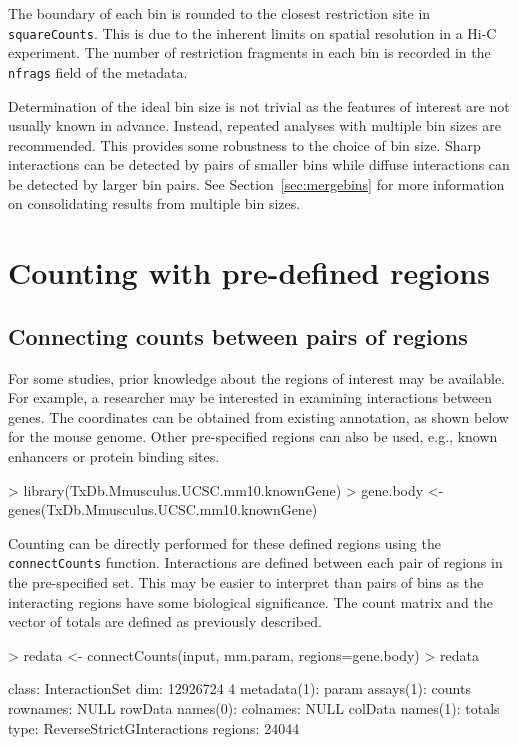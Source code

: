 \documentclass[12pt]{report}
\renewenvironment{Schunk}{\vspace{0pt}}{\vspace{0pt}}
\newcommand{\code}[1]{{\small\texttt{#1}}}
\begin{document}
The boundary of each bin is rounded to the closest restriction site in \code{squareCounts}.
This is due to the inherent limits on spatial resolution in a Hi-C experiment.
The number of restriction fragments in each bin is recorded in the \code{nfrags} field of the metadata.

Determination of the ideal bin size is not trivial as the features of interest are not usually known in advance.
Instead, repeated analyses with multiple bin sizes are recommended.
This provides some robustness to the choice of bin size.
Sharp interactions can be detected by pairs of smaller bins while diffuse interactions can be detected by larger bin pairs.
See Section~\ref{sec:mergebins} for more information on consolidating results from multiple bin sizes.

\section{Counting with pre-defined regions}

\subsection{Connecting counts between pairs of regions}
For some studies, prior knowledge about the regions of interest may be available.
For example, a researcher may be interested in examining interactions between genes.
The coordinates can be obtained from existing annotation, as shown below for the mouse genome.
Other pre-specified regions can also be used, e.g., known enhancers or protein binding sites.

\begin{Schunk}
\begin{Sinput}
> library(TxDb.Mmusculus.UCSC.mm10.knownGene)
> gene.body <- genes(TxDb.Mmusculus.UCSC.mm10.knownGene)
\end{Sinput}
\end{Schunk}


Counting can be directly performed for these defined regions using the \code{connectCounts} function.
Interactions are defined between each pair of regions in the pre-specified set.
This may be easier to interpret than pairs of bins as the interacting regions have some biological significance.
The count matrix and the vector of totals are defined as previously described.

\begin{Schunk}
\begin{Sinput}
> redata <- connectCounts(input, mm.param, regions=gene.body)
> redata
\end{Sinput}
\begin{Soutput}
class: InteractionSet 
dim: 12926724 4 
metadata(1): param
assays(1): counts
rownames: NULL
rowData names(0):
colnames: NULL
colData names(1): totals
type: ReverseStrictGInteractions
regions: 24044
\end{Soutput}
\end{Schunk}
\end{document}
